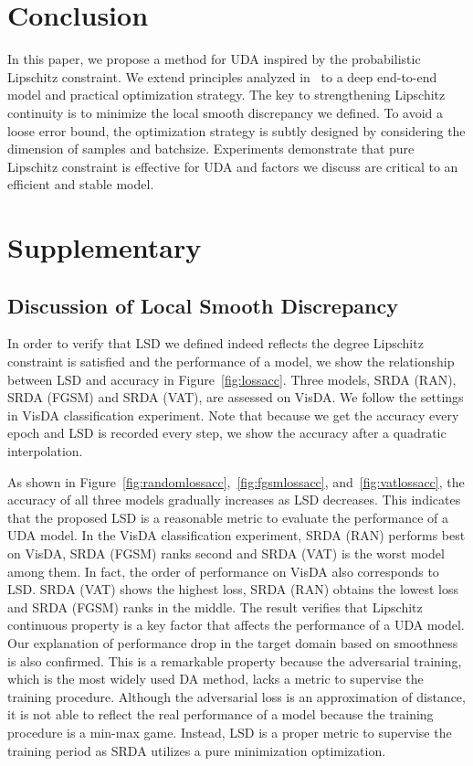 \documentclass[10pt,twocolumn,letterpaper]{article}
\begin{document}
\section{Conclusion}
\label{conclusion}

In this paper, we propose a method for UDA inspired by the probabilistic Lipschitz constraint. We extend principles analyzed in~\cite{Ben-David2014} to a deep end-to-end model and practical optimization strategy. The key to strengthening Lipschitz continuity is to minimize the local smooth discrepancy we defined. To avoid a loose error bound, the optimization strategy is subtly designed by considering the dimension of samples and batchsize. Experiments demonstrate that pure Lipschitz constraint is effective for UDA and factors we discuss are critical to an efficient and stable model.



{\small


}


\newpage
\onecolumn
\section{Supplementary}

\subsection{Discussion of Local Smooth Discrepancy}

In order to verify that LSD we defined indeed reflects the degree Lipschitz constraint is satisfied and the performance of a model, we show the relationship between LSD and accuracy in Figure~\ref{fig:lossacc}. Three models, SRDA (RAN), SRDA (FGSM) and SRDA (VAT), are assessed on VisDA. We follow the settings in VisDA classification experiment. Note that because we get the accuracy every epoch and LSD is recorded every step, we show the accuracy after a quadratic interpolation.

As shown in Figure~\ref{fig:randomlossacc},~\ref{fig:fgsmlossacc}, and~\ref{fig:vatlossacc}, the accuracy of all three models gradually increases as LSD decreases. This indicates that the proposed LSD is a reasonable metric to evaluate the performance of a UDA model. In the VisDA classification experiment, SRDA (RAN) performs best on VisDA, SRDA (FGSM) ranks second and SRDA (VAT) is the worst model among them. In fact, the order of performance on VisDA also corresponds to LSD. SRDA (VAT) shows the highest loss, SRDA (RAN) obtains the lowest loss and SRDA (FGSM) ranks in the middle. The result verifies that Lipschitz continuous property is a key factor that affects the performance of a UDA model. Our explanation of performance drop in the target domain based on smoothness is also confirmed. This is a remarkable property because the adversarial training, which is the most widely used DA method, lacks a metric to supervise the training procedure. Although the adversarial loss is an approximation of    distance, it is not able to reflect the real performance of a model because the training procedure is a min-max game. Instead, LSD is a proper metric to supervise the training period as SRDA utilizes a pure minimization optimization.
\end{document}
